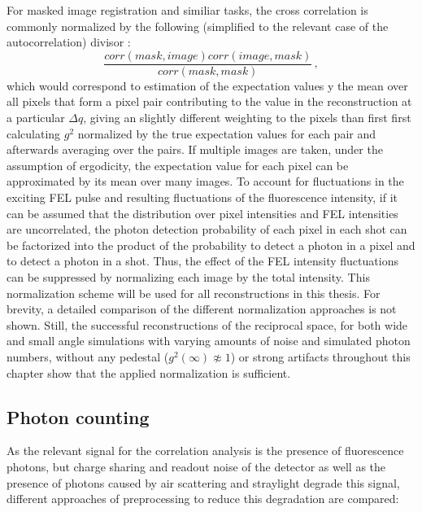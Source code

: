 For masked image registration and similiar tasks, the cross correlation is commonly normalized by the following (simplified to the relevant case of the autocorrelation) divisor \cite{padfield2010}:
\begin{equation}
\frac{\mathit{corr}(\mathit{mask},\mathit{image}) \mathit{corr}(\mathit{image},\mathit{mask})}{\mathit{corr}(\mathit{mask},\mathit{mask})} \,,
\end{equation} which would correspond to estimation of the expectation values  y the mean over all pixels that form a pixel pair contributing to the value in the reconstruction at a particular $\Delta q$, giving an slightly different weighting to the pixels than first first calculating $g^2$ normalized by the true expectation values for each pair and afterwards averaging over the pairs.
If multiple images are taken, under the assumption of ergodicity, the expectation value for each pixel can be approximated by its mean over many images. To account for fluctuations in the exciting FEL pulse and resulting fluctuations of the fluorescence intensity, if it can be assumed that the distribution over pixel intensities and FEL intensities are uncorrelated, the photon detection probability of each pixel in each shot can be factorized into the product of the probability to detect a photon in a pixel and to detect a photon in a shot. Thus, the effect of the FEL intensity fluctuations can be suppressed by normalizing each image by the total intensity. This normalization scheme will be used for all reconstructions in this thesis.
For brevity, a detailed comparison of the different normalization approaches is not shown. Still, the successful reconstructions of the reciprocal space, for both wide and small angle simulations with varying amounts of noise and simulated photon numbers, without any pedestal ($g^2(\infty)\not\approx 1$) or strong artifacts throughout this chapter show that the applied normalization is sufficient.  





\subsection{Photon counting}
As the relevant signal for the correlation analysis is the presence of fluorescence photons, but charge sharing and readout noise of the detector as well as the presence of photons caused by air scattering and straylight degrade this signal, different approaches  of preprocessing to reduce this degradation are compared:

